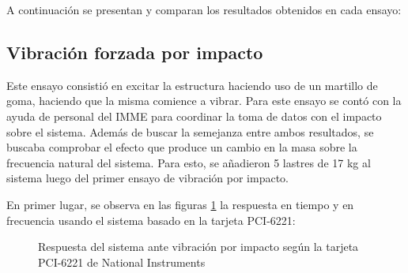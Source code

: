 A continuación se presentan y comparan los resultados obtenidos en cada ensayo:

\subsection{Vibración forzada por impacto}

Este ensayo consistió en excitar la estructura haciendo uso de un martillo de goma, haciendo que la misma comience a vibrar. Para este ensayo se contó con la ayuda de personal del IMME para coordinar la toma de datos con el impacto sobre el sistema. Además de buscar la semejanza entre ambos resultados, se buscaba comprobar el efecto que produce un cambio en la masa sobre la frecuencia natural del sistema. Para esto, se añadieron 5 lastres de 17 kg al sistema luego del primer ensayo de vibración por impacto.

En primer lugar, se observa en las figuras \ref{fig:DAQHammer} la respuesta en tiempo y en frecuencia usando el sistema basado en la tarjeta PCI-6221:

\begin{figure}[H]
    \centering
    \hfill
    \caption{Respuesta del sistema ante vibración por impacto según la tarjeta PCI-6221 de National Instruments}
    \label{fig:DAQHammer}
\end{figure}

